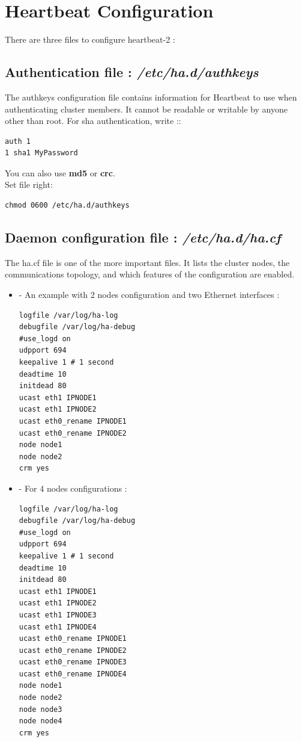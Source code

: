 \documentclass[a4paper,10pt]{report}
\begin{document}
\section{Heartbeat Configuration}

There are three files to configure heartbeat-2 :
\subsection{Authentication file : \textit{/etc/ha.d/authkeys}}
The authkeys configuration file contains information for Heartbeat to use when authenticating cluster members. It cannot be readable or writable by anyone other than root. For sha authentication, write ::
\begin{lstlisting}
auth 1
1 sha1 MyPassword
\end{lstlisting}
You can also use \textbf{md5} or \textbf{crc}.\\
Set file right:
\begin{lstlisting}
chmod 0600 /etc/ha.d/authkeys
\end{lstlisting}

\subsection{Daemon configuration file : \textit{/etc/ha.d/ha.cf}}

The ha.cf file is one of the more important files. It lists the cluster nodes, the communications topology, and which features of the configuration are enabled. 
\begin{itemize}
\item - An example with 2 nodes configuration and two Ethernet interfaces :
\begin{lstlisting}
logfile /var/log/ha-log
debugfile /var/log/ha-debug
#use_logd on
udpport 694
keepalive 1 # 1 second
deadtime 10
initdead 80
ucast eth1 IPNODE1
ucast eth1 IPNODE2
ucast eth0_rename IPNODE1
ucast eth0_rename IPNODE2
node node1
node node2
crm yes
\end{lstlisting}

\item - For 4 nodes configurations :
\begin{lstlisting}
logfile /var/log/ha-log
debugfile /var/log/ha-debug
#use_logd on
udpport 694
keepalive 1 # 1 second
deadtime 10
initdead 80
ucast eth1 IPNODE1
ucast eth1 IPNODE2
ucast eth1 IPNODE3
ucast eth1 IPNODE4
ucast eth0_rename IPNODE1
ucast eth0_rename IPNODE2
ucast eth0_rename IPNODE3
ucast eth0_rename IPNODE4
node node1
node node2
node node3
node node4
crm yes
\end{lstlisting}
\end{itemize}
\end{document}
